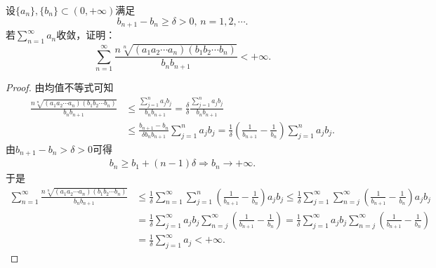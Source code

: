 \documentclass[../../main.tex]{subfiles}
\begin{document}
\begin{example}
设$\{a_n\},\{b_n\} \subset (0,+\infty)$满足
\[ b_{n + 1} - b_n \geqslant \delta > 0, \, n = 1,2,\cdots. \]
若$\sum_{n = 1}^{\infty} a_n$收敛，证明：
\[ \sum_{n = 1}^{\infty} \frac{n\sqrt[n]{(a_1 a_2 \cdots a_n)(b_1 b_2 \cdots b_n)}}{b_n b_{n + 1}} < +\infty. \]
\end{example}
\begin{proof}
由均值不等式可知
\begin{align*}
\frac{n\sqrt[n]{(a_1a_2\cdots a_n)(b_1b_2\cdots b_n)}}{b_nb_{n+1}}&\leqslant \frac{\sum\limits_{j=1}^n{a_jb_j}}{b_nb_{n+1}}=\frac{\delta}{\delta}\frac{\sum\limits_{j=1}^n{a_jb_j}}{b_nb_{n+1}} \\
&\leqslant \frac{b_{n+1}-b_n}{\delta b_nb_{n+1}}\sum_{j=1}^n{a_jb_j}=\frac{1}{\delta}\left( \frac{1}{b_{n+1}}-\frac{1}{b_n} \right) \sum_{j=1}^n{a_jb_j}.
\end{align*}
由$b_{n+1}-b_n>\delta >0$可得
\begin{align*}
b_n\geqslant b_1+\left( n-1 \right) \delta \Longrightarrow b_n\rightarrow +\infty .
\end{align*}
于是
\begin{align*}
\sum_{n=1}^{\infty}{\frac{n\sqrt[n]{(a_1a_2\cdots a_n)(b_1b_2\cdots b_n)}}{b_nb_{n+1}}}&\leqslant \frac{1}{\delta}\sum_{n=1}^{\infty}{\sum_{j=1}^n{\left( \frac{1}{b_{n+1}}-\frac{1}{b_n} \right) a_jb_j}}\leqslant \frac{1}{\delta}\sum_{j=1}^{\infty}{\sum_{n=j}^{\infty}{\left( \frac{1}{b_{n+1}}-\frac{1}{b_n} \right) a_jb_j}}
\\
&=\frac{1}{\delta}\sum_{j=1}^{\infty}{a_jb_j\sum_{n=j}^{\infty}{\left( \frac{1}{b_{n+1}}-\frac{1}{b_n} \right)}}=\frac{1}{\delta}\sum_{j=1}^{\infty}{a_jb_j\sum_{n=j}^{\infty}{\left( \frac{1}{b_{n+1}}-\frac{1}{b_n} \right)}}
\\
&=\frac{1}{\delta}\sum_{j=1}^{\infty}{a_j}<+\infty .
\end{align*}

\end{proof}
\end{document}
